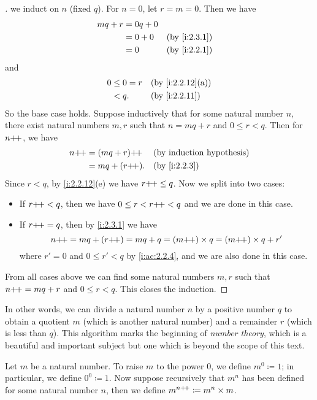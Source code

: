 \begin{proof}[]
  we induct on \(n\) (fixed \(q\)).
  For \(n = 0\), let \(r = m = 0\).
  Then we have
  \begin{align*}
    mq + r & = 0q + 0                   \\
           & = 0 + 0  &  & \by{i:2.3.1} \\
           & = 0      &  & \by{i:2.2.1}
  \end{align*}
  and
  \begin{align*}
    0 & \leq 0 = r &  & \by{i:2.2.12}[a] \\
      & < q.       &  & \by{i:2.2.11}
  \end{align*}
  So the base case holds.
  Suppose inductively that for some natural number \(n\), there exist natural numbers \(m, r\) such that \(n = mq + r\) and \(0 \leq r < q\).
  Then for \(n{+}\!{+}\), we have
  \begin{align*}
    n\pp & = (mq + r)\pp  &  & \byIH        \\
         & = mq + (r\pp). &  & \by{i:2.2.3} \\
  \end{align*}
  Since \(r < q\), by \cref{i:2.2.12}(e) we have \(r{+}\!{+} \leq q\).
  Now we split into two cases:
  \begin{itemize}
    \item If \(r{+}\!{+} < q\), then we have \(0 \leq r < r{+}\!{+} < q\) and we are done in this case.
    \item If \(r{+}\!{+} = q\), then by \cref{i:2.3.1} we have
          \[
            n{+}\!{+} = mq + (r{+}\!{+}) = mq + q = (m{+}\!{+}) \times q = (m{+}\!{+}) \times q + r'
          \]
          where \(r' = 0\) and \(0 \leq r' < q\) by \cref{i:ac:2.2.4}, and we are also done in this case.
  \end{itemize}
  From all cases above we can find some natural numbers \(m, r\) such that \(n{+}\!{+} = mq + r\) and \(0 \leq r < q\).
  This closes the induction.
\end{proof}

\begin{rmk}\label{i:2.3.10}
  In other words, we can divide a natural number \(n\) by a positive number \(q\) to obtain a quotient \(m\) (which is another natural number) and a remainder \(r\) (which is less than \(q\)).
  This algorithm marks the beginning of \emph{number theory}, which is a beautiful and important subject but one which is beyond the scope of this text.
\end{rmk}

\begin{defn}\label{i:2.3.11}
  Let \(m\) be a natural number.
  To raise \(m\) to the power \(0\), we define \(m^0 \coloneqq 1\); in particular, we define \(0^0 \coloneqq 1\).
  Now suppose recursively that \(m^n\) has been defined for some natural number \(n\), then we define \(m^{n{+}\!{+}} \coloneqq m^n \times m\).
\end{defn}

